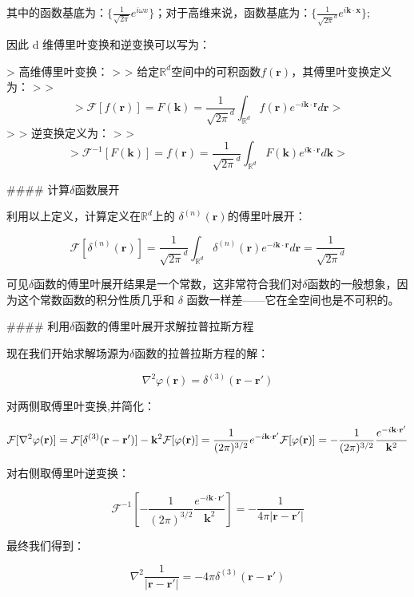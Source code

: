 \documentclass[lang=cn,10pt,newtx,bibend=biber,device=pad]{elegantbook}
\begin{document}
其中的函数基底为：$\{\frac{1}{\sqrt{2\pi}}e^{i\omega x}\}$；对于高维来说，函数基底为：$\{\frac{1}{\sqrt{2\pi}^{d}}e^{i\mathbf{k}\cdot\mathbf{x}}\}$;

因此 d 维傅里叶变换和逆变换可以写为：

> 高维傅里叶变换：
>
> 给定$\mathbb{R}^d$​空间中的可积函数$f(\mathbf{r})$，其傅里叶变换定义为：
>
> $$
> \mathcal{F}[f(\mathbf{r})] = F(\mathbf{k}) =\frac{1}{\sqrt{2\pi}^{d}} \int_{\mathbb{R}^d} f(\mathbf{r}) e^{-i \mathbf{k} \cdot \mathbf{r}} d\mathbf{r}
> $$
>
> 逆变换定义为：
>
> $$
> \mathcal{F}^{-1}[F(\mathbf{k})] = f(\mathbf{r}) =\frac{1}{\sqrt{2\pi}^{d}} \int_{\mathbb{R}^d} F(\mathbf{k}) e^{i \mathbf{k} \cdot \mathbf{r}} d\mathbf{k}
> $$

#### 计算$\delta$函数展开

利用以上定义，计算定义在$\mathbb{R}^d$上的 $\delta^{(n)}(\mathbf{r})$的傅里叶展开：

$$
\mathcal{F}[\delta^{(n)}(\mathbf{r})]  =\frac{1}{\sqrt{2\pi}^{d}} \int_{\mathbb{R}^d} \delta^{(n)}(\mathbf{r}) e^{-i \mathbf{k} \cdot \mathbf{r}} d\mathbf{r} = \frac{1}{\sqrt{2\pi}^{d}}
$$

可见$\delta$函数的傅里叶展开结果是一个常数，这非常符合我们对$\delta$函数的一般想象，因为这个常数函数的积分性质几乎和 $\delta$ 函数一样差——它在全空间也是不可积的。

#### 利用$\delta$函数的傅里叶展开求解拉普拉斯方程

现在我们开始求解场源为$\delta$函数的拉普拉斯方程的解：

$$
\nabla^2 \varphi(\mathbf{r}) = \delta^{(3)}(\mathbf{r}-\mathbf{r'})
$$

对两侧取傅里叶变换,并简化：

$$
\mathcal{F}[\nabla^2 \varphi(\mathbf{r})] = \mathcal{F}[\delta^{(3)}(\mathbf{r}-\mathbf{r'})]\\
-\mathbf{k}^2\mathcal{F}[\varphi(\mathbf{r})]=\frac{1}{(2\pi)^{3/2}}e^{-i\mathbf{k}\cdot\mathbf{r'}}\\
\mathcal{F}[\varphi(\mathbf{r})]=-\frac{1}{(2\pi)^{3/2}}\frac{e^{-i\mathbf{k}\cdot\mathbf{r'}}}{\mathbf{k}^2}
$$

对右侧取傅里叶逆变换：

$$
\mathcal{F}^{-1}[-\frac{1}{(2\pi)^{3/2}}\frac{e^{-i\mathbf{k}\cdot\mathbf{r'}}}{\mathbf{k}^2}] = -\frac{1}{4\pi|\mathbf{r}-\mathbf{r'}|}
$$

最终我们得到：

$$
\nabla^2 \frac{1}{|\mathbf{r}-\mathbf{r'}|} = -4\pi \delta^{(3)}(\mathbf{r}-\mathbf{r'})
$$
    
\end{document}

